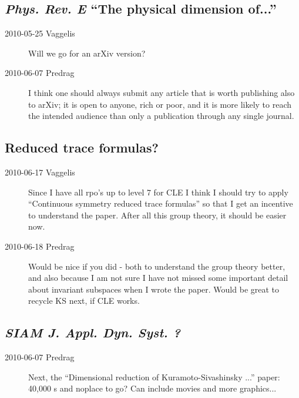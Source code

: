 \subsection{\emph{Phys. Rev. E} ``The physical dimension of...''}

\begin{description}

\item[2010-05-25 Vaggelis]
Will we go for an arXiv version?

\item[2010-06-07 Predrag]
I think one should always submit
any article that is worth publishing also to arXiv;
it is open to anyone, rich or poor, and it is
more likely to reach the intended audience than only a publication through
any single journal.

\end{description}

\subsection{Reduced trace formulas?}

\begin{description}
 \item[2010-06-17 Vaggelis]
Since I have all rpo's up to level 7 for CLE I think I should try
to apply ``Continuous symmetry reduced trace formulas'' so that I get an incentive
to understand the paper. After all this group theory, it should be easier now.
 \item[2010-06-18 Predrag]
Would be nice if you did - both to understand the group theory better, and
also because I am not sure I have not missed some important detail about
invariant subspaces when I wrote the paper. Would be great to recycle KS
next, if CLE works.
\end{description}


\subsection{\emph{SIAM J. Appl. Dyn. Syst. ?}}

\begin{description}

\item[2010-06-07 Predrag] Next, the
``Dimensional reduction of Kuramoto-Sivashinsky ...'' paper:
40,000 \rpo s and noplace to go?
Can include movies and more graphics...

\end{description}
